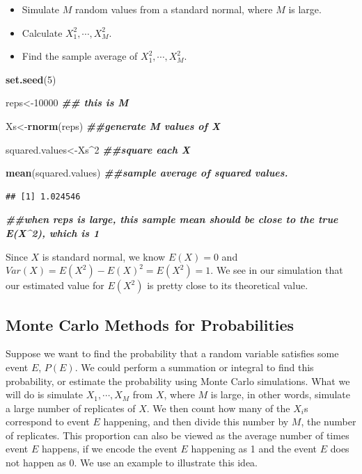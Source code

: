 \documentclass[
]{book}
\newenvironment{Shaded}{\begin{snugshade}}{\end{snugshade}}
\newcommand{\DecValTok}[1]{\textcolor[rgb]{0.00,0.00,0.81}{#1}}
\newcommand{\DocumentationTok}[1]{\textcolor[rgb]{0.56,0.35,0.01}{\textbf{\textit{#1}}}}
\newcommand{\FunctionTok}[1]{\textcolor[rgb]{0.13,0.29,0.53}{\textbf{#1}}}
\newcommand{\NormalTok}[1]{#1}
\newcommand{\OtherTok}[1]{\textcolor[rgb]{0.56,0.35,0.01}{#1}}
\newcommand{\SpecialCharTok}[1]{\textcolor[rgb]{0.81,0.36,0.00}{\textbf{#1}}}
\providecommand{\tightlist}{%
  \setlength{\itemsep}{0pt}\setlength{\parskip}{0pt}}
\theoremstyle{definition}
\theoremstyle{definition}
\theoremstyle{definition}
\theoremstyle{definition}
\theoremstyle{remark}
\begin{document}
\begin{itemize}
\tightlist
\item
  Simulate \(M\) random values from a standard normal, where \(M\) is large.
\item
  Calculate \(X_1^2, \cdots, X_M^2\).
\item
  Find the sample average of \(X_1^2, \cdots, X_M^2\).
\end{itemize}

\begin{Shaded}
\begin{Highlighting}[]
\FunctionTok{set.seed}\NormalTok{(}\DecValTok{5}\NormalTok{)}

\NormalTok{reps}\OtherTok{\textless{}{-}}\DecValTok{10000} \DocumentationTok{\#\# this is M}

\NormalTok{Xs}\OtherTok{\textless{}{-}}\FunctionTok{rnorm}\NormalTok{(reps) }\DocumentationTok{\#\#generate M values of X}

\NormalTok{squared.values}\OtherTok{\textless{}{-}}\NormalTok{Xs}\SpecialCharTok{\^{}}\DecValTok{2} \DocumentationTok{\#\#square each X}

\FunctionTok{mean}\NormalTok{(squared.values) }\DocumentationTok{\#\#sample average of squared values. }
\end{Highlighting}
\end{Shaded}

\begin{verbatim}
## [1] 1.024546
\end{verbatim}

\begin{Shaded}
\begin{Highlighting}[]
\DocumentationTok{\#\#when reps is large, this sample mean should be close to the true E(X\^{}2), which is 1}
\end{Highlighting}
\end{Shaded}

Since \(X\) is standard normal, we know \(E(X) = 0\) and \(Var(X) = E(X^2) - E(X)^2 = E(X^2) = 1\). We see in our simulation that our estimated value for \(E(X^2)\) is pretty close to its theoretical value.

\hypertarget{monte-carlo-methods-for-probabilities}{%
\subsection{Monte Carlo Methods for Probabilities}\label{monte-carlo-methods-for-probabilities}}

Suppose we want to find the probability that a random variable satisfies some event \(E\), \(P(E)\). We could perform a summation or integral to find this probability, or estimate the probability using Monte Carlo simulations. What we will do is simulate \(X_1, \cdots, X_M\) from \(X\), where \(M\) is large, in other words, simulate a large number of replicates of \(X\). We then count how many of the \(X_i\)s correspond to event \(E\) happening, and then divide this number by \(M\), the number of replicates. This proportion can also be viewed as the average number of times event \(E\) happens, if we encode the event \(E\) happening as 1 and the event \(E\) does not happen as 0. We use an example to illustrate this idea.
\end{document}

